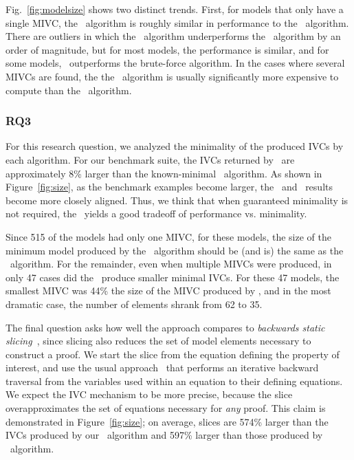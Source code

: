 Fig.~\ref{fig:modelsize} shows two distinct trends.  First, for models that only have a single MIVC, the \aivcalg\ algorithm is roughly similar in performance to the \ucbfalg\ algorithm.  There are outliers in which the \aivcalg\ algorithm underperforms the \ucbfalg\ algorithm by an order of magnitude, but for most models, the performance is similar, and for some models, \aivcalg\ outperforms the brute-force algorithm.
In the cases where several MIVCs are found, the the \aivcalg\ algorithm is usually significantly more expensive to compute than the \ucbfalg\ algorithm.



\subsubsection{RQ3}
For this research question, we analyzed the minimality of the produced IVCs by each algorithm.  For our benchmark suite, the IVCs returned by \ucalg\ are approximately 8\% larger than the known-minimal \ucbfalg\ algorithm.  As shown in Figure~\ref{fig:size}, as the benchmark examples become larger, the \ucalg\ and \ucbfalg\ results become more closely aligned.  Thus, we think that when guaranteed minimality is not required, the \ucalg\ yields a good tradeoff of performance vs. minimality.

Since 515 of the models had only one MIVC, for these models, the size of the minimum model produced by the \aivcalg\ algorithm should be (and is) the same as the \ucbfalg\ algorithm.  For the remainder, even when multiple MIVCs were produced, in only 47 cases did the \aivcalg\ produce smaller minimal IVCs.  For these 47 models, the smallest MIVC was 44\% the size of the MIVC produced by \ucbfalg, and in the most dramatic case, the number of elements shrank from 62 to 35. %

The final question asks how well the approach compares to {\em backwards static slicing}~\cite{Tip95asurvey}, since slicing also reduces the set of model elements necessary to construct a proof.  We start the slice from the equation defining the property of interest, and use the usual approach~\cite{Gaucher03:slicing} that performs an iterative backward traversal from the variables used within an equation to their defining equations.  We expect the IVC mechanism to be more precise, because the slice overapproximates the set of equations necessary for {\em any} proof.  This claim is demonstrated in Figure~\ref{fig:size}; on average, slices are 574\% larger than the IVCs produced by our \ucalg\ algorithm and 597\% larger than those produced by \ucbfalg\ algorithm.

